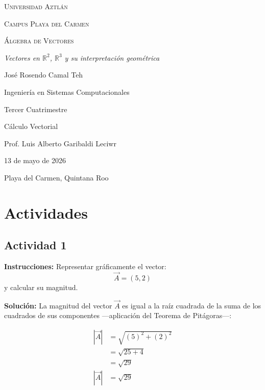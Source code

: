 \documentclass[12pt]{article}
\begin{document}
\begin{titlepage}
	\centering
	{\scshape\LARGE Universidad Aztlán \par}
	\vspace{1cm}
	{\scshape\Large Campus Playa del Carmen \par}
	\vspace{3cm}
	{\scshape\Huge Álgebra de Vectores \par}
	\vspace{1cm}
	{\itshape\Large Vectores en $\mathbb{R}^2$, $\mathbb{R}^3$ y su interpretación geométrica \par}
	\vspace{3cm}
	{\Large José Rosendo Camal Teh \par}
	\vfill
	{\Large Ingeniería en Sistemas Computacionales \par}
	{\Large Tercer Cuatrimestre \par}
	{\Large Cálculo Vectorial \par}
	\vfill
	{\Large Prof. Luis Alberto Garibaldi Leciwr \par}
	\vfill
	{\Large 13 de mayo de 2026 \par}
	\vfill
	{\Large Playa del Carmen, Quintana Roo \par}
\end{titlepage}

\section*{Actividades}

\subsection*{Actividad 1}

\textbf{Instrucciones:} Representar gráficamente el vector:
\[ \vec{A} = \left( 5, 2 \right) \]
y calcular su magnitud.
\newline

\textbf{Solución:}
La magnitud del vector $\vec{A}$ es igual a la raíz cuadrada de la suma de los cuadrados de sus componentes ---aplicación del Teorema de Pitágoras---:

\begin{align*}
	|\vec{A}| &= \sqrt{ (5)^2 + (2)^2 } \\
	&= \sqrt{ 25 + 4 } \\
	&= \sqrt{29} \\
	|\vec{A}| &= \sqrt{29}
\end{align*}
\end{document}
